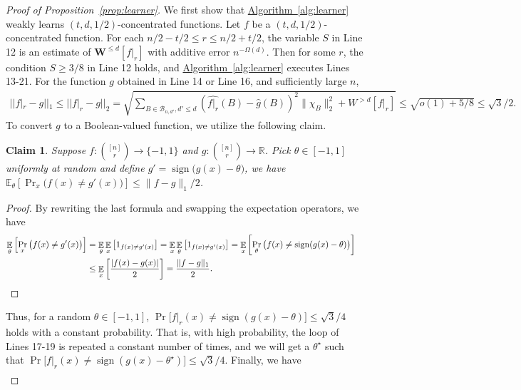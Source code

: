 \documentclass[11pt]{article}
\numberwithin{equation}{section}
\newtheorem{claim}[theorem]{Claim}
\theoremstyle{definition}
\theoremstyle{plain}
\newcommand{\expref}[2]{\hyperref[#2]{#1~\ref{#2}}}
\DeclareMathOperator*{\E}{\mathbb{E}}
\newcommand{\W}{\mathbf{W}}
\begin{document}
\begin{proof}[Proof of Proposition~\ref{prop:learner}]
We first show that \expref{Algorithm}{alg:learner} weakly learns $(t,d,1/2)$-concentrated functions. Let $f$ be a $(t,d,1/2)$-concentrated function. For each $n/2-t/2\leq r\leq n/2+t/2$, the variable $S$ in Line 12 is an estimate of $\W^{\leq d}[f|_r]$ with additive error $n^{-\Omega(d)}$. Then for some $r$, the condition $S\geq 3/8$ in Line 12 holds, and \expref{Algorithm}{alg:learner} executes Lines 13-21. 
For the function $g$ obtained in Line 14 or Line 16, and sufficiently large $n$, 
\begin{align*}
  ||f|_{r}-g||_1\leq ||f|_{r}-g||_2 = \sqrt{\sum_{B\in \mathcal{B}_{n,d'}, d'\leq d}{(\widehat{f|_{r}}(B)-\hat{g}(B))^2}\|\chi_B\|_2^2+W^{>d}[f|_{r}]}\leq \sqrt{o(1)+5/8}\leq \sqrt{3}/2.
\end{align*}
To convert $g$ to a Boolean-valued function, we utilize the following claim. 
\begin{claim}\label{lem:learn}
 Suppose $f:
 \binom{[n]}{r} %
 \rightarrow\{-1,1\}$ and $g:
 \binom{[n]}{r} %
 \rightarrow \mathbb{R}$. Pick $\theta \in [-1,1]$ uniformly at random and define $g'=\operatorname{sign}\big(g(x)-\theta\big)$, we have $\mathbb{E}_\theta\left[\Pr_x\big(f(x)\neq g'(x)\big)\right]\leq \|f-g\|_1/2$.
\end{claim}
\begin{proof} By rewriting the last formula and swapping the expectation operators, we have
\begin{equation*}
     \begin{aligned}
        \E_\theta \left[\Pr_x\big(f(x)\neq g'(x)\big)\right] &= \E_\theta \E_x \left[1_{f(x) \neq g'(x)}\right] = \E_x\E_\theta \left[1_{f(x) \neq g'(x)}\right]
        = \E_x\left[\Pr_\theta \big(f(x) \neq \operatorname{sign}(g(x)-\theta)\big)\right]\\
          &\leq\E_x\left[\frac{|f(x)-g(x)|}{2}\right]=\frac{\|f-g\|_1}{2}. & \qedhere
%
    \end{aligned}
\end{equation*}
\end{proof}
Thus, for a random $\theta\in[-1,1]$, $\Pr\big[f|_{r}(x)\neq \operatorname{sign}(g(x)-\theta)\big] \leq \sqrt{3}/4$ holds with a constant probability. That is, with high probability, the loop of Lines 17-19 is repeated a constant number of times, and we will get a $\theta^\star$ such that $\Pr\big[f|_{r}(x)\neq \operatorname{sign}(g(x)-\theta^\star)\big] \leq \sqrt{3}/4$. Finally, we have
%
%
\begin{align} %

\end{align}
\end{proof}
\end{document}
